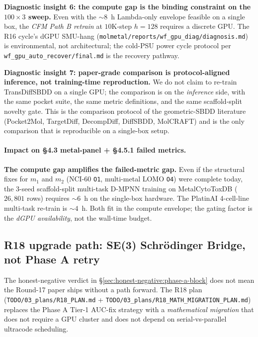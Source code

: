 \textbf{Diagnostic insight 6: the compute gap is the binding
constraint on the $100{\times}3$ sweep.}  Even with the
$\sim 8$~h Lambda-only envelope feasible on a single box,
the \emph{CFM Path B retrain} at $10$K-step $h{=}128$ requires a
discrete GPU.  The R16 cycle's dGPU SMU-hang
(\texttt{molmetal/reports/wf\_gpu\_diag/diagnosis.md}) is
environmental, not architectural; the cold-PSU power cycle
protocol per \texttt{wf\_gpu\_auto\_recover/final.md} is the
recovery pathway.

\textbf{Diagnostic insight 7: paper-grade comparison is
protocol-aligned inference, not training-time reproduction.}
We do not claim to re-train TransDiffSBDD on a single GPU; the
comparison is on the \emph{inference} side, with the same pocket
suite, the same metric definitions, and the same scaffold-split
novelty gate.  This is the comparison protocol of the geometric-SBDD
literature (Pocket2Mol, TargetDiff, DecompDiff, DiffSBDD,
MolCRAFT) and is the only comparison that is reproducible on a
single-box setup.

\paragraph{Impact on §4.3 metal-panel + §4.5.1 failed metrics.}
\textbf{The compute gap amplifies the failed-metric gap.}  Even
if the structural fixes for $m_1$ and $m_2$ (NCI-60
\texttt{O1}, multi-metal LOMO \texttt{O4}) were complete today,
the $3$-seed scaffold-split multi-task D-MPNN training on
MetalCytoToxDB ($26{,}801$ rows) requires $\sim 6$~h on the
single-box hardware.  The PlatinAI 4-cell-line multi-task
re-train is $\sim 4$~h.  Both fit in the compute envelope; the
gating factor is the \emph{dGPU availability}, not the wall-time
budget.

\subsection{R18 upgrade path: SE(3) Schr\"odinger Bridge, not Phase A retry}
\label{sec:honest-negative:r18-pivot}

The honest-negative verdict in
§\ref{sec:honest-negative:phase-a-block} does not mean the
Round-17 paper ships without a path forward.  The R18 plan
(\texttt{TODO/03\_plans/R18\_PLAN.md} +
\texttt{TODO/03\_plans/R18\_MATH\_MIGRATION\_PLAN.md}) replaces the
Phase A Tier-1 AUC-fix strategy with a \emph{mathematical
migration} that does not require a GPU cluster and does not
depend on serial-vs-parallel ultracode scheduling.

